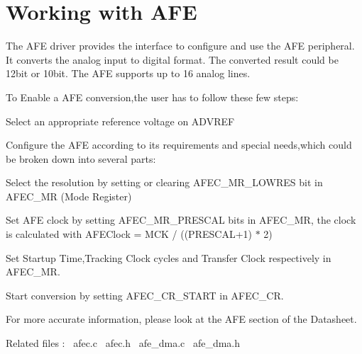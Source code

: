 \hypertarget{group__AFEC__module}{}\section{Working with A\+FE}
\label{group__AFEC__module}
The A\+FE driver provides the interface to configure and use the A\+FE peripheral. ~\newline
 It converts the analog input to digital format. The converted result could be 12bit or 10bit. The A\+FE supports up to 16 analog lines.

To Enable a A\+FE conversion,the user has to follow these few steps\+: 
\begin{DoxyItemize}
\item Select an appropriate reference voltage on A\+D\+V\+R\+EF  
\item Configure the A\+FE according to its requirements and special needs,which could be broken down into several parts\+:
\begin{DoxyEnumerate}
\item Select the resolution by setting or clearing A\+F\+E\+C\+\_\+\+M\+R\+\_\+\+L\+O\+W\+R\+ES bit in A\+F\+E\+C\+\_\+\+MR (Mode Register)
\item Set A\+FE clock by setting A\+F\+E\+C\+\_\+\+M\+R\+\_\+\+P\+R\+E\+S\+C\+AL bits in A\+F\+E\+C\+\_\+\+MR, the clock is calculated with A\+F\+E\+Clock = M\+CK / ((P\+R\+E\+S\+C\+A\+L+1) $\ast$ 2)
\item Set Startup Time,Tracking Clock cycles and Transfer Clock respectively in A\+F\+E\+C\+\_\+\+MR.  
\end{DoxyEnumerate}
\item Start conversion by setting A\+F\+E\+C\+\_\+\+C\+R\+\_\+\+S\+T\+A\+RT in A\+F\+E\+C\+\_\+\+CR.  
\end{DoxyItemize}

For more accurate information, please look at the A\+FE section of the Datasheet.

Related files \+:~\newline
 afec.\+c~\newline
 afec.\+h~\newline
 afe\+\_\+dma.\+c~\newline
 afe\+\_\+dma.\+h~\newline
 